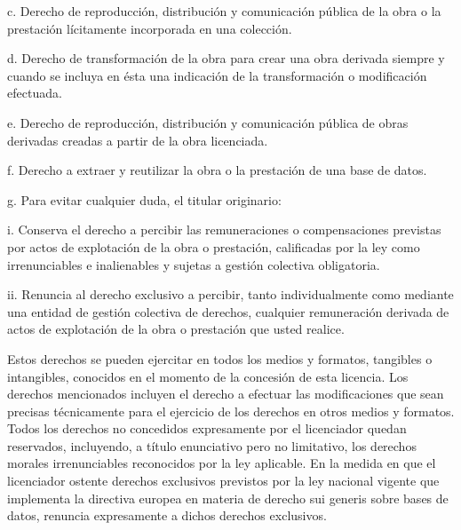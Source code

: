 \documentclass[11pt]{article}
\begin{document}
{{c. Derecho de reproducción, distribución y comunicación pública de la obra o la prestación lícitamente incorporada en una colección. 

d. Derecho de transformación de la obra para crear una obra derivada siempre y cuando se incluya en ésta una indicación de la transformación o modificación efectuada. 

e. Derecho de reproducción, distribución y comunicación pública de obras derivadas creadas a partir de la obra licenciada. 

f. Derecho a extraer y reutilizar la obra o la prestación de una base de datos. 

g. Para evitar cualquier duda, el titular originario: 

i. Conserva el derecho a percibir las remuneraciones o compensaciones previstas por actos de explotación de la obra o prestación, calificadas por la ley como irrenunciables e inalienables y sujetas a gestión colectiva obligatoria. 

ii. Renuncia al derecho exclusivo a percibir, tanto individualmente como mediante una entidad de gestión colectiva de derechos, cualquier remuneración derivada de actos de explotación de la obra o prestación que usted realice. 

Estos derechos se pueden ejercitar en todos los medios y formatos, tangibles o intangibles, conocidos en el momento de la concesión de esta licencia. Los derechos mencionados incluyen el derecho a efectuar las modificaciones que sean precisas técnicamente para el ejercicio de los derechos en otros medios y formatos. Todos los derechos no concedidos expresamente por el licenciador quedan reservados, incluyendo, a título enunciativo pero no limitativo, los derechos morales irrenunciables reconocidos por la ley aplicable. En la medida en que el licenciador ostente derechos exclusivos previstos por la ley nacional vigente que implementa la directiva europea en materia de derecho sui generis sobre bases de datos, renuncia expresamente a dichos derechos exclusivos. 

}}
\end{document}
